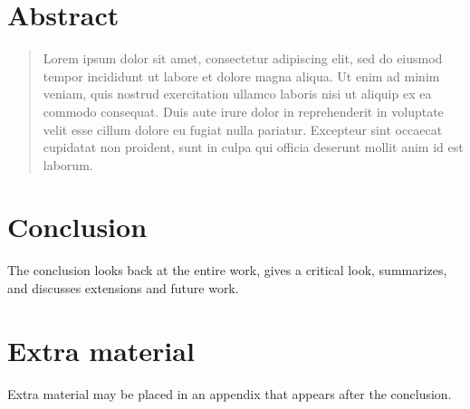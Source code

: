 \documentclass[a4paper,twoside,openright,11pt]{report}
\begin{document}
\chapter*{\centering Abstract}
\begin{quote}\noindent
  Lorem ipsum dolor sit amet, consectetur adipiscing elit, sed do eiusmod
  tempor incididunt ut labore et dolore magna aliqua. Ut enim ad minim
  veniam, quis nostrud exercitation ullamco laboris nisi ut aliquip ex ea
  commodo consequat. Duis aute irure dolor in reprehenderit in voluptate
  velit esse cillum dolore eu fugiat nulla pariatur. Excepteur sint
  occaecat cupidatat non proident, sunt in culpa qui officia deserunt
  mollit anim id est laborum.
\end{quote}

\cleardoublepage


\tableofcontents


\cleardoublepage








\chapter{Conclusion}
\label{ch:conclusion}

The conclusion looks back at the entire work, gives a critical look,
summarizes, and discusses extensions and future work.


\appendix
\chapter{Extra material}
\label{app:extra}

Extra material may be placed in an appendix that appears after the conclusion.



\nocite{*}


\end{document}
